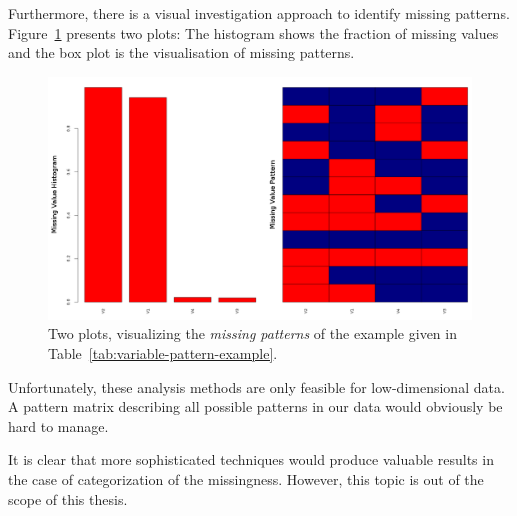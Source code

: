 Furthermore, there is a visual investigation approach to identify missing patterns. Figure~\ref{fig:missing-plot} presents two plots: The histogram shows the fraction of missing values and the box plot is the visualisation of missing patterns.

\begin{figure}[h!]
    \centering
    \includegraphics[scale=0.3]{Graphics/missing-pattern-plot.png}
    \caption{Two plots, visualizing the \textit{missing patterns} of the example given in Table~\ref{tab:variable-pattern-example}.}
    \label{fig:missing-plot}
\end{figure}

Unfortunately, these analysis methods are only feasible for low-dimensional data. A pattern matrix describing all possible patterns in our data would obviously be hard to manage.

It is clear that more sophisticated techniques would produce valuable results in the case of categorization of the missingness. However, this topic is out of the scope of this thesis.

